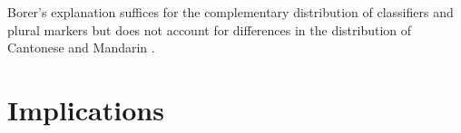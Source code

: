 \documentclass[output=paper]{langsci/langscibook}
\begin{document}
\begin{exe}
\ex\label{ex:23.14}
{\premulticols=0pt\postmulticols=0pt
\begin{multicols}{2}\raggedcolumns
\begin{xlist}
\ex\relax [$+$\Clf{} $-$\Pl]\\
\columnbreak
    \ex\relax [$-$\Clf{} $+$\Pl]\\
\end{xlist}
\end{multicols}}
\end{exe}

Borer’s explanation suffices for the complementary distribution of classifiers
and plural markers but does not account for differences in the distribution of
Cantonese and Mandarin .

\section{Implications}
\end{document}
